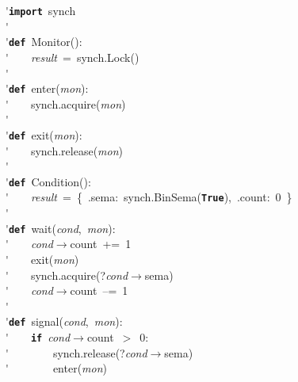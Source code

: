\'\>\texttt{\textbf{import}}~synch\\

\'\>\\

\'\>\texttt{\textbf{def}}~Monitor():\\

\'\>~~~~\textit{result}~=~synch.Lock()\\

\'\>\\

\'\>\texttt{\textbf{def}}~enter(\textit{mon}):\\

\'\>~~~~synch.acquire(\textit{mon})\\

\'\>\\

\'\>\texttt{\textbf{def}}~exit(\textit{mon}):\\

\'\>~~~~synch.release(\textit{mon})\\

\'\>\\

\'\>\texttt{\textbf{def}}~Condition():\\

\'\>~~~~\textit{result}~=~\{~.sema:~synch.BinSema(\texttt{\textbf{True}}),~.count:~0~\}\\

\'\>\\

\'\>\texttt{\textbf{def}}~wait(\textit{cond},~\textit{mon}):\\

\'\>~~~~\textit{cond}$\rightarrow$count~+=~1\\

\'\>~~~~exit(\textit{mon})\\

\'\>~~~~synch.acquire(?\textit{cond}$\rightarrow$sema)\\

\'\>~~~~\textit{cond}$\rightarrow$count~--=~1\\

\'\>\\

\'\>\texttt{\textbf{def}}~signal(\textit{cond},~\textit{mon}):\\

\'\>~~~~\texttt{\textbf{if}}~\textit{cond}$\rightarrow$count~$>$~0:\\

\'\>~~~~~~~~synch.release(?\textit{cond}$\rightarrow$sema)\\

\'\>~~~~~~~~enter(\textit{mon})